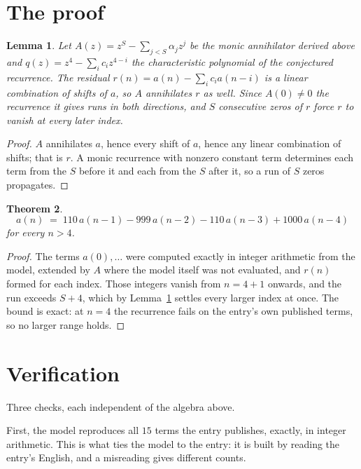 \documentclass[11pt,a4paper]{article}
\theoremstyle{plain}
\newtheorem{theorem}{Theorem}
\newtheorem{lemma}[theorem]{Lemma}
\theoremstyle{definition}
\begin{document}
\section{The proof}

\begin{lemma}\label{lem:crit}
Let $A(z)=z^S-\sum_{j<S}\alpha_jz^{j}$ be the monic annihilator derived above and
$q(z)=z^{4}-\sum_ic_iz^{4-i}$ the characteristic polynomial of the conjectured
recurrence. The residual $r(n)=a(n)-\sum_ic_ia(n-i)$ is a linear combination of shifts of $a$,
so $A$ annihilates $r$ as well. Since $A(0)\ne0$ the recurrence it gives runs in both
directions, and $S$ consecutive zeros of $r$ force $r$ to vanish at every later index.
\end{lemma}

\begin{proof}
$A$ annihilates $a$, hence every shift of $a$, hence any linear combination of shifts; that is
$r$. A monic recurrence with nonzero constant term determines each term from the $S$ before it
and each from the $S$ after it, so a run of $S$ zeros propagates.
\end{proof}

\begin{theorem}
\[
a(n)\;=\;110\,a(n-1) - 999\,a(n-2) - 110\,a(n-3) + 1000\,a(n-4)
\]
for every $n>4$.
\end{theorem}

\begin{proof}
The terms $a(0),\dots$ were computed exactly in integer arithmetic from the model, extended by
$A$ where the model itself was not evaluated, and $r(n)$ formed for each index. Those integers
vanish from $n=4+1$ onwards, and the run exceeds $S+4$, which by
Lemma~\ref{lem:crit} settles every larger index at once. The bound is exact: at $n=4$ the recurrence fails on the entry's own published terms, so no larger range holds.
\end{proof}

\section{Verification}

Three checks, each independent of the algebra above.

First, the model reproduces all $15$ terms the entry publishes, exactly, in integer
arithmetic. This is what ties the model to the entry: it is built by reading the entry's
English, and a misreading gives different counts.
\end{document}
